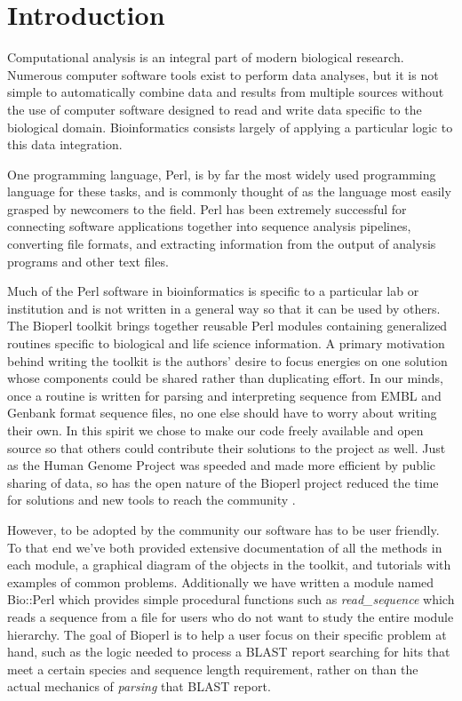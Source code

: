 \documentclass[12pt]{article}
\begin{document}
\section{Introduction}

Computational analysis is an integral part of modern biological
research.  Numerous computer software tools exist to perform 
data analyses, but it is not simple to automatically
combine data and results from multiple sources without the use of
computer software designed to read and write data specific to the
biological domain.  Bioinformatics consists largely of applying a
particular logic to this data integration.

One programming language, Perl, is by far the most widely used
programming language for these tasks, and is commonly thought of as
the language most easily grasped by newcomers to the field.  Perl has
been extremely successful for connecting software applications together into
sequence analysis pipelines, converting file formats, and extracting
information from the output of analysis programs and other text files.

Much of the Perl software in bioinformatics is specific to a
particular lab or institution and is not written in a general way so
that it can be used by others.  The Bioperl toolkit brings together
reusable Perl modules containing generalized routines specific to
biological and life science information.  A primary motivation behind
writing the toolkit is the authors' desire to focus energies on one
solution whose components could be shared rather than duplicating
effort.  In our minds, once a routine is written for parsing and
interpreting sequence from EMBL and Genbank format sequence files, no
one else should have to worry about writing their own.  In this spirit
we chose to make our code freely available and open source so that
others could contribute their solutions to the project as well.  Just
as the Human Genome Project was speeded and made more efficient by
public sharing of data, so has the open nature of the Bioperl project
reduced the time for solutions and new tools to reach the community
\cite{waterston}.

However, to be adopted by the community our software has to be user
friendly.  To that end we've both provided extensive documentation of
all the methods in each module, a graphical diagram of the objects in
the toolkit, and tutorials with examples of common problems.
Additionally we have written a module named Bio::Perl which provides
simple procedural functions  such as \textit{read\_sequence} which reads a sequence
from a file for users who do not want to study the entire module
hierarchy.  The goal of Bioperl is to help a user focus on their
specific problem at hand, such as the logic needed to process a BLAST
\cite{blast} report searching for hits that meet a certain species and
sequence length requirement, rather on than the actual mechanics of
\textit{parsing} that BLAST report.
\end{document}
